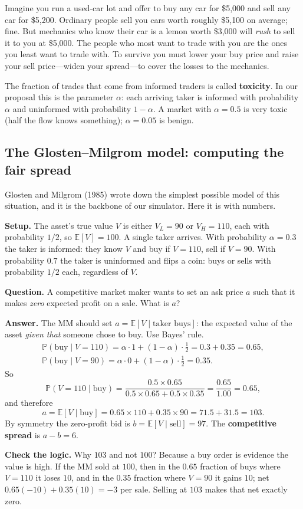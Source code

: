 \documentclass[11pt]{article}
\newcommand{\E}{\mathbb{E}}
\newcommand{\Prob}{\mathbb{P}}
\begin{document}
\begin{intuition}
Imagine you run a used-car lot and offer to buy any car for \$5{,}000 and sell any car for \$5{,}200. Ordinary people sell you cars worth roughly \$5{,}100 on average; fine. But mechanics who know their car is a lemon worth \$3{,}000 will \emph{rush} to sell it to you at \$5{,}000. The people who most want to trade with you are the ones you least want to trade with. To survive you must lower your buy price and raise your sell price---widen your spread---to cover the losses to the mechanics.
\end{intuition}

The fraction of trades that come from informed traders is called \textbf{toxicity}. In our proposal this is the parameter $\alpha$: each arriving taker is informed with probability $\alpha$ and uninformed with probability $1-\alpha$. A market with $\alpha=0.5$ is very toxic (half the flow knows something); $\alpha=0.05$ is benign.

\subsection{The Glosten--Milgrom model: computing the fair spread}\label{sec:gm}
Glosten and Milgrom (1985) wrote down the simplest possible model of this situation, and it is the backbone of our simulator. Here it is with numbers.

\begin{example}
\textbf{Setup.} The asset's true value $V$ is either $V_L=90$ or $V_H=110$, each with probability $1/2$, so $\E[V]=100$. A single taker arrives. With probability $\alpha=0.3$ the taker is informed: they know $V$ and buy if $V=110$, sell if $V=90$. With probability $0.7$ the taker is uninformed and flips a coin: buys or sells with probability $1/2$ each, regardless of $V$.

\textbf{Question.} A competitive market maker wants to set an ask price $a$ such that it makes \emph{zero} expected profit on a sale. What is $a$?

\textbf{Answer.} The MM should set $a=\E[V\mid \text{taker buys}]$: the expected value of the asset \emph{given that} someone chose to buy. Use Bayes' rule.
\begin{gather*}
\Prob(\text{buy}\mid V=110)=\alpha\cdot 1+(1-\alpha)\cdot\tfrac12=0.3+0.35=0.65,\\
\Prob(\text{buy}\mid V=90)=\alpha\cdot 0+(1-\alpha)\cdot\tfrac12=0.35.
\end{gather*}
So
\[
\Prob(V=110\mid\text{buy})=\frac{0.5\times0.65}{0.5\times0.65+0.5\times0.35}=\frac{0.65}{1.00}=0.65,
\]
and therefore
\[
a=\E[V\mid\text{buy}]=0.65\times110+0.35\times90=71.5+31.5=103.
\]
By symmetry the zero-profit bid is $b=\E[V\mid\text{sell}]=97$. The \textbf{competitive spread} is $a-b=6$.

\textbf{Check the logic.} Why $103$ and not $100$? Because a buy order is evidence the value is high. If the MM sold at $100$, then in the $0.65$ fraction of buys where $V=110$ it loses $10$, and in the $0.35$ fraction where $V=90$ it gains $10$; net $0.65(-10)+0.35(10)=-3$ per sale. Selling at $103$ makes that net exactly zero.
\end{example}
\end{document}
